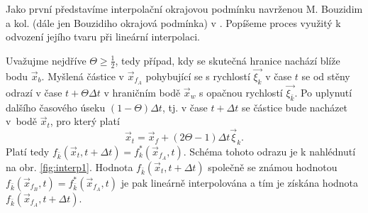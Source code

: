 Jako první představíme interpolační okrajovou podmínku navrženou M. Bouzidim a kol. (dále jen Bouzidiho okrajová podmínka) v \cite{Bouzidi2001}. Popíšeme proces využitý k odvození jejího tvaru při lineární interpolaci.

Uvažujme nejdříve $ \Theta \geq \frac{1}{2} $, tedy případ, kdy se skutečná hranice nachází blíže bodu $ \vec{x}_b $. Myšlená částice v $ \vec{x}_{f{_A}} $ pohybující se s rychlostí $ \vec{\xi_{k}} $ v čase $ t $ se od stěny odrazí v čase $ t + \Theta \Delta t$ v hraničním bodě $ \vec{x}_w $ s opačnou rychlostí $ \vec{\xi_{\bar{k}}} $. Po uplynutí dalšího časového úseku $ (1 - \Theta ) \Delta t $, tj. v čase $ t + \Delta t$ se částice bude nacházet v~bodě $ \vec{x}_t $, pro který platí
\begin{equation}
	\vec{x}_t = \vec{x}_f + (2\Theta - 1)\Delta t \vec{\xi}_{k}.
\end{equation}
Platí tedy $ f_{\bar{k}} (\vec{x}_t, t + \Delta t) = f^{*}_k ( \vec{x}_{f{_A}}, t)$. Schéma tohoto odrazu je k nahlédnutí na obr. \ref{fig:interp1}. Hodnota $ f_{\bar{k}} (\vec{x}_t, t + \Delta t)$ společně se známou hodnotou $ f_{\bar{k}} ( \vec{x}_{f{_B}}, t) = f^{*}_{\bar{k}} ( \vec{x}_{f{_A}}, t)$ je pak lineárně interpolována a tím je získána hodnota $ f_{\bar{k}}\left(\vec{x}_{f{_A}}, t+\Delta t\right) $.

